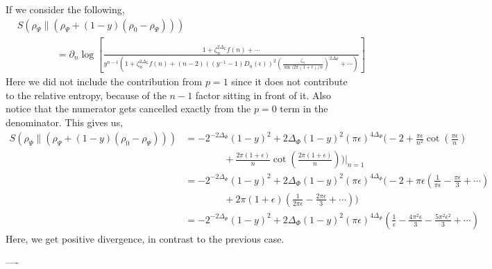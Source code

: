 \documentclass[11pt]{article}
\newcommand{\ep}{\epsilon}
\newcommand{\p}{\partial}
\newcommand{\nn}{\nonumber}
\newcommand{\lb}{\left(}
\newcommand{\rb}{\right)}
\begin{document}
If we consider the following,
\begin{align}
   & S
(\rho_\Psi \|( \rho_\Psi + (1-y)(\rho_0 - \rho_\Psi))) \\&\qquad\qquad= \p_n \log \left[\frac{1+\zeta_n^{2\Delta_L}f(n) + \cdots}{y^{n-1}\lb 1+\zeta_n^{2\Delta_L}f(n) + (n-2)\lb (y^{-1}-1)D_n(\ep)\rb^2 \lb\frac{\zeta_n}{\sin(2\pi(1+\ep)/n}\rb^{2\Delta_\Phi} +\cdots\rb}\right]
\end{align}
Here we did not include the contribution from $p=1$ since it does not contribute to the relative entropy, because of the $n-1$ factor sitting in front of it. Also notice that the numerator gets cancelled exactly from the $p=0$ term in the denominator. This gives us,
\begin{align}
    S
(\rho_\Psi \|( \rho_\Psi + (1-y)(\rho_0 - \rho_\Psi))) &=-2^{-2\Delta_\Phi}(1-y)^2 + 2\Delta_\Phi (1-y)^2 (\pi \ep)^{4\Delta_\Phi}\Bigg( -2  + \frac{\pi \ep}{n^2} \cot \lb\frac{\pi \ep}{n}\rb   \nn\\
    &\qquad\qquad +\frac{2\pi (1+\ep)}{n} \cot \lb\frac{2\pi (1+\ep)}{n}\rb \Bigg)\Big|_{n=1}\\
    &= -2^{-2\Delta_\Phi}(1-y)^2 + 2\Delta_\Phi (1-y)^2 (\pi \ep)^{4\Delta_\Phi}\Bigg( -2 + \pi \ep \lb \frac{1}{\pi \ep} - \frac{\pi \ep}{3} + \cdots\rb \nn\\
    &\qquad \qquad + 2\pi (1+\ep)\lb \frac{1}{2\pi \ep} - \frac{2\pi \ep}{3} + \cdots \rb\Bigg)\\
    &= -2^{-2\Delta_\Phi}(1-y)^2 + 2\Delta_\Phi (1-y)^2 (\pi \ep)^{4\Delta_\Phi}\lb \frac{1}{\ep} - \frac{4\pi^2 \ep}{3} - \frac{5\pi^2 \ep^2}{3} + \cdots \rb
\end{align}
Here, we get positive divergence, in contrast to the previous case. 

----
\end{document}
